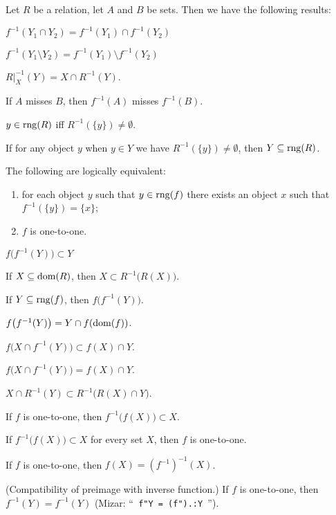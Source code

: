 \documentclass{article}
\begin{document}
Let $R$ be a relation, let $A$ and $B$ be sets. Then we have the following results:
\begin{thm}
\item\label{funct1:68} $f^{-1}(Y_{1}\cap Y_{2})=f^{-1}(Y_{1})\cap f^{-1}(Y_{2})$
\item\label{funct1:69} $f^{-1}(Y_{1}\setminus Y_{2})=f^{-1}(Y_{1})\setminus f^{-1}(Y_{2})$
\item\label{funct1:70} $R|_{X}^{-1}(Y)=X\cap R^{-1}(Y)$. 
\item\label{funct1:71} If $A$ misses $B$, then $f^{-1}(A)$ misses $f^{-1}(B)$.
\item\label{funct1:72} $y\in\operatorname{rng}(R)$ iff $R^{-1}(\{y\})\neq\emptyset$.
\item\label{funct1:73} If for any object $y$ when $y\in Y$ we have
  $R^{-1}(\{y\})\neq\emptyset$, then $Y\subseteq\operatorname{rng}(R)$.
\item\label{funct1:74} The following are logically equivalent:
  \begin{enumerate}[label=(\roman*)]
  \item for each object $y$ such that $y\in\operatorname{rng}(f)$ there exists an
    object $x$ such that $f^{-1}(\{y\})=\{x\}$;
  \item $f$ is one-to-one.
  \end{enumerate}
\item\label{funct1:75} $f\bigl(f^{-1}(Y)\bigr)\subset Y$
\item\label{funct1:76} If $X\subseteq\operatorname{dom}(R)$, then $X\subset R^{-1}\bigl(R(X)\bigr)$.
\item\label{funct1:77} If $Y\subseteq\operatorname{rng}(f)$,
  then $f\bigl(f^{-1}(Y)\bigr)$.
\item\label{funct1:78} $f\bigl(f^{-1}(Y)\bigr)=Y\cap f(\operatorname{dom}(f))$.
\item\label{funct1:79} $f\bigl(X\cap f^{-1}(Y)\bigr)\subset f(X)\cap Y$.
\item\label{funct1:80} $f\bigl(X\cap f^{-1}(Y)\bigr)= f(X)\cap Y$.
\item\label{funct1:81} $X\cap R^{-1}(Y)\subset R^{-1}\bigl(R(X)\cap Y\bigr)$.
\item\label{funct1:82} If $f$ is one-to-one, then $f^{-1}\bigl(f(X)\bigr)\subset X$.
\item\label{funct1:83} If $f^{-1}\bigl(f(X)\bigr)\subset X$ for every
  set $X$, then $f$ is one-to-one.
\item\label{funct1:84} If $f$ is one-to-one, then $f(X)=(f^{-1})^{-1}(X)$.
\item\label{funct1:85} (Compatibility of preimage with inverse function.) If $f$ is one-to-one, then $f^{-1}(Y)=f^{-1}(Y)$
(Mizar: ``\verb# f"Y = (f").:Y #'').
\end{thm}
\end{document}
